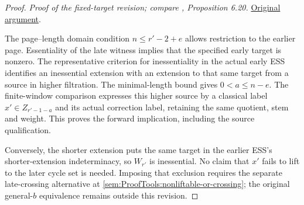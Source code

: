 \begin{proof}
\textit{Proof of the fixed-target revision; compare \cite{LWX126}, Proposition 6.20.} \href{paper/main.tex.html#L1995}{Original argument}.

The page--length domain condition $n\le r'-2+e$ allows restriction to the earlier page. Essentiality of the late witness implies that the specified early target is nonzero. The representative criterion for inessentiality in the actual early ESS identifies an inessential extension with an extension to that same target from a source in higher filtration. The minimal-length bound gives $0<a\le n-e$. The finite-window comparison expresses this higher source by a classical label $x'\in Z_{r'-1-a}$ and its actual correction label, retaining the same quotient, stem and weight. This proves the forward implication, including the source qualification.

Conversely, the shorter extension puts the same target in the earlier ESS's shorter-extension indeterminacy, so $W_{r'}$ is inessential. No claim that $x'$ fails to lift to the later cycle set is needed. Imposing that exclusion requires the separate late-crossing alternative at \ref{sem:ProofTools:nonliftable-or-crossing}; the original general-$b$ equivalence remains outside this revision.
\end{proof}

